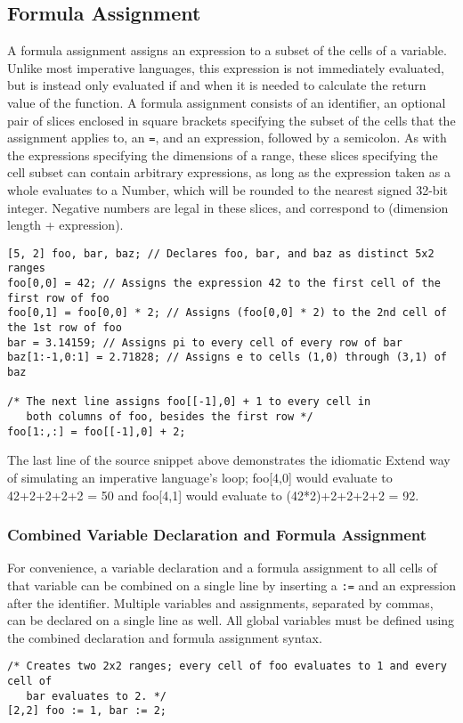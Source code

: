 \subsection{Formula Assignment}
\label{sec:formula}
A formula assignment assigns an expression to a subset of the cells of a variable. Unlike most imperative languages, this expression is not immediately evaluated, but is instead only evaluated if and when it is needed to calculate the return value of the function. A formula assignment consists of an identifier, an optional pair of slices enclosed in square brackets specifying the subset of the cells that the assignment applies to, an \texttt{=}, and an expression, followed by a semicolon. As with the expressions specifying the dimensions of a range, these slices specifying the cell subset can contain arbitrary expressions, as long as the expression taken as a whole evaluates to a Number, which will be rounded to the nearest signed 32-bit integer. Negative numbers are legal in these slices, and correspond to (dimension length + expression).
\begin{lstlisting}
[5, 2] foo, bar, baz; // Declares foo, bar, and baz as distinct 5x2 ranges
foo[0,0] = 42; // Assigns the expression 42 to the first cell of the first row of foo
foo[0,1] = foo[0,0] * 2; // Assigns (foo[0,0] * 2) to the 2nd cell of the 1st row of foo
bar = 3.14159; // Assigns pi to every cell of every row of bar
baz[1:-1,0:1] = 2.71828; // Assigns e to cells (1,0) through (3,1) of baz

/* The next line assigns foo[[-1],0] + 1 to every cell in
   both columns of foo, besides the first row */
foo[1:,:] = foo[[-1],0] + 2;
\end{lstlisting}
The last line of the source snippet above demonstrates the idiomatic Extend way of simulating an imperative language's loop; foo[4,0] would evaluate to 42+2+2+2+2 = 50 and foo[4,1] would evaluate to (42*2)+2+2+2+2 = 92.
\subsubsection{Combined Variable Declaration and Formula Assignment}
For convenience, a variable declaration and a formula assignment to all cells of that variable can be combined on a single line by inserting a \texttt{:=} and an expression after the identifier. Multiple variables and assignments, separated by commas, can be declared on a single line as well. All global variables must be defined using the combined declaration and formula assignment syntax.
\begin{lstlisting}
/* Creates two 2x2 ranges; every cell of foo evaluates to 1 and every cell of
   bar evaluates to 2. */
[2,2] foo := 1, bar := 2;
\end{lstlisting}

